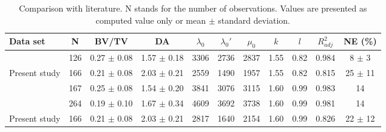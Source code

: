 \documentclass[a4paper,fleqn]{DC_ArtStyle}
\begin{document}
\begin{table*}[b]
	\caption{Comparison with literature. N stands for the number of observations. Values are presented as computed value only or mean $\pm$ standard deviation.}
	\label{Table4}
	\begin{tabular}{lcccccccccc}
		\toprule
		Data set & N & BV/TV & DA & $\lambda_0$ & $\lambda_0'$ & $\mu_0$ & $k$ & $l$ & $R^2_{adj}$ & NE (\%) \\
		\midrule
		\citeauthor{Panyasantisuk2015} \cite{Panyasantisuk2015} & 126 & 0.27 $\pm$ 0.08 & 1.57 $\pm$ 0.18 & 3306 & 2736 & 2837 & 1.55 & 0.82 & 0.984 & 8 $\pm$ 3\\
		
		Present study & 166 & 0.21 $\pm$ 0.08 & 2.03 $\pm$ 0.21 & 2559 & 1490 & 1957 & 1.55 & 0.82 & 0.815 & 25 $\pm$ 11\\[3ex]
		
		\citeauthor{Panyasantisuk2015} \cite{Panyasantisuk2015} & 167 & 0.25 $\pm$ 0.08 & 1.54 $\pm$ 0.20 & 3841 & 3076 & 3115 & 1.60 & 0.99 & 0.983 & 14\\
		
		\citeauthor{Gross2013} \cite{Gross2013} & 264 & 0.19 $\pm$ 0.10 & 1.67 $\pm$ 0.34 & 4609 & 3692 & 3738 & 1.60 & 0.99 & 0.981 & 14\\
		
		Present study & 166 & 0.21 $\pm$ 0.08 & 2.03 $\pm$ 0.21 & 2817 & 1640 & 2154 & 1.60 & 0.99 & 0.826 & 22 $\pm$ 12\\
		\bottomrule
	\end{tabular}
\end{table*}
\end{document}
